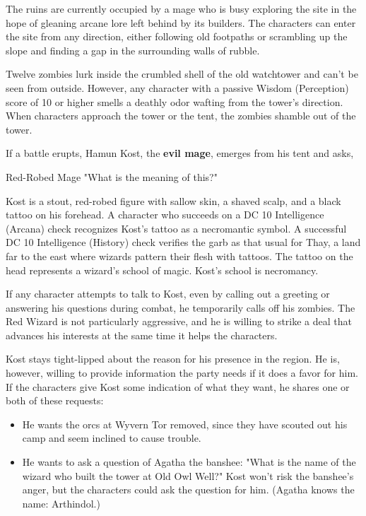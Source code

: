 \documentclass[10pt,a4paper,twoside,bg=print,twocolumn,openany,nodeprecatedcode]{dndbook}
\begin{document}
The ruins are currently occupied by a mage who is busy exploring the site in the hope of gleaning arcane lore left behind by its builders. The characters can enter the site from any direction, either following old footpaths or scrambling up the slope and finding a gap in the surrounding walls of rubble.

Twelve zombies lurk inside the crumbled shell of the old watchtower and can't be seen from outside. However, any character with a passive Wisdom (Perception) score of 10 or higher smells a deathly odor wafting from the tower's direction. When characters approach the tower or the tent, the zombies shamble out of the tower.

If a battle erupts, Hamun Kost, the \textbf{evil mage}, emerges from his tent and asks,

\begin{DndSidebar}[float=!b]{Red-Robed Mage}
"What is the meaning of this?"



\end{DndSidebar}

Kost is a stout, red-robed figure with sallow skin, a shaved scalp, and a black tattoo on his forehead. A character who succeeds on a DC 10 Intelligence (Arcana) check recognizes Kost's tattoo as a necromantic symbol. A successful DC 10 Intelligence (History) check verifies the garb as that usual for Thay, a land far to the east where wizards pattern their flesh with tattoos. The tattoo on the head represents a wizard's school of magic. Kost's school is necromancy.

If any character attempts to talk to Kost, even by calling out a greeting or answering his questions during combat, he temporarily calls off his zombies. The Red Wizard is not particularly aggressive, and he is willing to strike a deal that advances his interests at the same time it helps the characters.

Kost stays tight-lipped about the reason for his presence in the region. He is, however, willing to provide information the party needs if it does a favor for him. If the characters give Kost some indication of what they want, he shares one or both of these requests:


\begin{itemize}
\item He wants the orcs at Wyvern Tor removed, since they have scouted out his camp and seem inclined to cause trouble.
\item He wants to ask a question of Agatha the banshee: "What is the name of the wizard who built the tower at Old Owl Well?" Kost won't risk the banshee's anger, but the characters could ask the question for him. (Agatha knows the name: Arthindol.)
\end{itemize}
\end{document}
